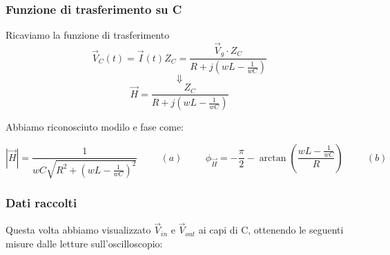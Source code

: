 \documentclass{article}
\theoremstyle{definition}
\begin{document}
\subsubsection{Funzione di trasferimento su C}
Ricaviamo la funzione di trasferimento
\[\vec{V}_{C}(t) = \vec{I}(t)Z_{C} = \frac{\vec{V}_{g}\cdot Z_{C}}{R+j(wL - \frac{1}{wC})}\]
\[\Downarrow\]
\[\vec{H} = \frac{Z_{C}}{R+j(wL - \frac{1}{wC})} \]

\noindent Abbiamo riconosciuto modilo e fase come:

\[\left|\vec{H}\right|=\frac{1}{wC\sqrt{R^2 + (wL - \frac{1}{wC})^2}}\hspace{1cm} (a) \hspace{1cm} \phi_{\vec{H}}= - \frac{\pi}{2} - \arctan\left(\frac{wL- \frac{1}{wC}}{R}\right)\hspace{1cm} (b) \]


\subsubsection*{Dati raccolti}
Questa volta abbiamo visualizzato \(\vec{V}_{in}\) e \(\vec{V}_{out}\) ai capi di C, ottenendo le seguenti misure dalle letture sull'oscilloscopio: 
\end{document}
